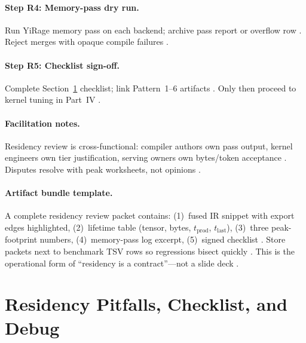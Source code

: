 \paragraph{Step R4: Memory-pass dry run.}
Run YiRage memory pass on each backend; archive pass report or overflow row \citep{yirage2026,wu2024mirage}.
Reject merges with opaque compile failures \citep{patel2025llminference,amd2024xdna}.

\paragraph{Step R5: Checklist sign-off.}
Complete Section~\ref{sec:ch06_residency_pitfalls} checklist; link Pattern~1--6 artifacts \citep{chen2020compilerbasedhardw,taxbreak2026}.
Only then proceed to kernel tuning in Part~IV \citep{semianalysis2024tma,dao2022flashattention}.

\paragraph{Facilitation notes.}
Residency review is cross-functional: compiler authors own pass output, kernel engineers own tier justification, serving owners own bytes/token acceptance \citep{patel2025llminference,yirage2026,memoryfloor2026}.
Disputes resolve with peak worksheets, not opinions \citep{taxbreak2026,chen2020compilerbasedhardw}.

\paragraph{Artifact bundle template.}
A complete residency review packet contains: (1)~fused IR snippet with export edges highlighted, (2)~lifetime table (tensor, bytes, $t_{\mathrm{prod}}$, $t_{\mathrm{last}}$), (3)~three peak-footprint numbers, (4)~memory-pass log excerpt, (5)~signed checklist \citep{yirage2026,chen2020compilerbasedhardw,patel2025llminference}.
Store packets next to benchmark TSV rows so regressions bisect quickly \citep{taxbreak2026,memoryfloor2026}.
This is the operational form of ``residency is a contract''---not a slide deck \citep{dlbook,rotem2018glow}.

\section{Residency Pitfalls, Checklist, and Debug}
\label{sec:ch06_residency_pitfalls}

